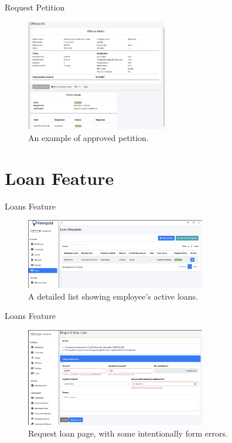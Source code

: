 \documentclass{loyola-beamer}
\begin{document}
\begin{frame}{Request Petition}
	\begin{figure}
		\begin{center}
			\includegraphics[width=0.55\textwidth]{figures/approved-pet.png}
		\end{center}
		\caption{An example of approved petition.}
	\end{figure}
\end{frame}

\section{Loan Feature}

\begin{frame}{Loans Feature}
	\begin{figure}
		\begin{center}
			\includegraphics[width=0.7\textwidth]{figures/loans.png}
		\end{center}
		\caption{A detailed list showing employee's active loans.}
	\end{figure}
\end{frame}

\begin{frame}{Loans Feature}
	\begin{figure}
		\begin{center}
			\includegraphics[width=0.7\textwidth]{figures/form-errors.png}
		\end{center}
		\caption{Request loan page, with some intentionally form errors.}
	\end{figure}
\end{frame}
\end{document}
